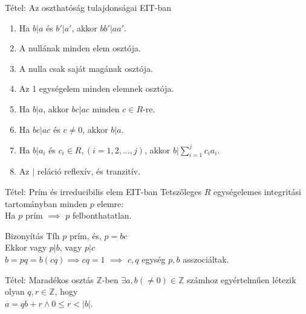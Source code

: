 \documentclass{beamer}
\begin{document}
\begin{frame}

\begin{block}{Tétel: Az oszthatóság tulajdonságai EIT-ban}
\begin{enumerate}
\item Ha $b|a$ és $b'|a'$, akkor $bb'|aa'$.
\item A nullának minden elem osztója.
\item A nulla csak saját magának osztója.
\item Az 1 egységelem minden elemnek osztója.
\item Ha $b|a$, akkor $bc|ac$ minden $c \in R$-re.
\item Ha $bc|ac$ és $c \neq 0$, akkor $b|a$.
\item Ha $b|a_i$ és $c_i \in R, (i = 1, 2, ..., j)$, akkor $b|\sum^j_{i=1} c_ia_i$.
\item Az $|$ reláció reflexív, és tranzitív.
\end{enumerate}
\end{block}

\end{frame}

\begin{frame}

\begin{block}{Tétel: Prím és irreducibilis elem EIT-ban}
Tetszőleges $R$ egységelemes integritási tartományban minden $p$ elemre:\\
Ha $p$ prím $\implies$ $p$ felbonthatatlan.
\end{block}

\begin{block}{Bizonyítás}
Tfh $p$ prím, és, $p = bc$\\
Ekkor vagy $p|b$, vagy $p|c$\\
$b = pq = b(cq) \implies cq = 1$ $\implies$ $c, q$ egység $p, b$ asszociáltak.

\end{block}

\end{frame}

\begin{frame}

\begin{block}{Tétel: Maradékos osztás $\mathbb{Z}$-ben}
${\exists}a, b({\neq}0) \in \mathbb{Z}$ számhoz egyértelműen létezik olyan $q, r \in \mathbb{Z}$, hogy\\
$a = qb + r \land 0 \leq r < |b|$.
\end{block}

\end{frame}
\end{document}
